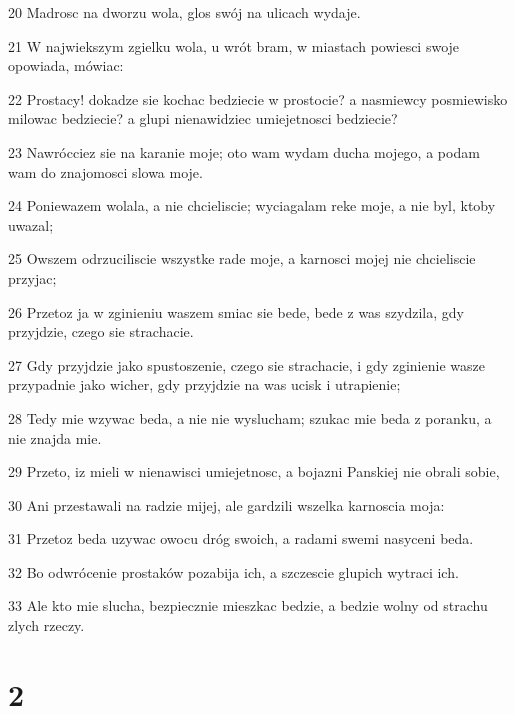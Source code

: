 \par 20 Madrosc na dworzu wola, glos swój na ulicach wydaje.
\par 21 W najwiekszym zgielku wola, u wrót bram, w miastach powiesci swoje opowiada, mówiac:
\par 22 Prostacy! dokadze sie kochac bedziecie w prostocie? a nasmiewcy posmiewisko milowac bedziecie? a glupi nienawidziec umiejetnosci bedziecie?
\par 23 Nawrócciez sie na karanie moje; oto wam wydam ducha mojego, a podam wam do znajomosci slowa moje.
\par 24 Poniewazem wolala, a nie chcieliscie; wyciagalam reke moje, a nie byl, ktoby uwazal;
\par 25 Owszem odrzuciliscie wszystke rade moje, a karnosci mojej nie chcieliscie przyjac;
\par 26 Przetoz ja w zginieniu waszem smiac sie bede, bede z was szydzila, gdy przyjdzie, czego sie strachacie.
\par 27 Gdy przyjdzie jako spustoszenie, czego sie strachacie, i gdy zginienie wasze przypadnie jako wicher, gdy przyjdzie na was ucisk i utrapienie;
\par 28 Tedy mie wzywac beda, a nie nie wyslucham; szukac mie beda z poranku, a nie znajda mie.
\par 29 Przeto, iz mieli w nienawisci umiejetnosc, a bojazni Panskiej nie obrali sobie,
\par 30 Ani przestawali na radzie mijej, ale gardzili wszelka karnoscia moja:
\par 31 Przetoz beda uzywac owocu dróg swoich, a radami swemi nasyceni beda.
\par 32 Bo odwrócenie prostaków pozabija ich, a szczescie glupich wytraci ich.
\par 33 Ale kto mie slucha, bezpiecznie mieszkac bedzie, a bedzie wolny od strachu zlych rzeczy.

\chapter{2}

